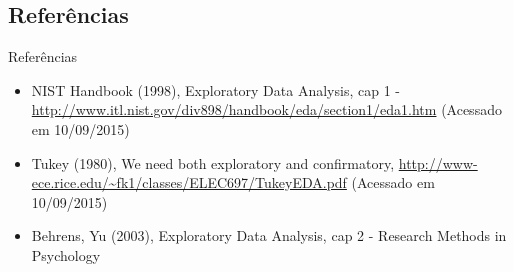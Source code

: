\documentclass{beamer}
\begin{document}
\subsection{Referências}

\begin{frame}{Referências}
  \begin{itemize}
  \item<1-> NIST Handbook (1998), Exploratory Data Analysis, cap 1 -
    \url{http://www.itl.nist.gov/div898/handbook/eda/section1/eda1.htm}
    (Acessado em 10/09/2015)
  \item<1-> Tukey (1980), We need both exploratory and confirmatory,
    \url{http://www-ece.rice.edu/~fk1/classes/ELEC697/TukeyEDA.pdf}
    (Acessado em 10/09/2015)
  \item<1-> Behrens, Yu (2003), Exploratory Data Analysis, cap 2 -
    Research Methods in Psychology
  \end{itemize}
\end{frame}
\end{document}
